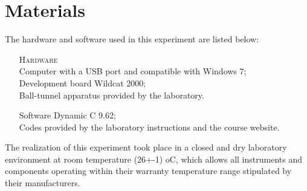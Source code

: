 \section{Materials}

The hardware and software used in this experiment are listed below:

\begin{enumerate}
\item[\textsc{Hardware}]\\
Computer with a USB port and compatible with Windows 7;
\\ Development board Wildcat 2000;
\\ Ball-tunnel apparatus provided by the laboratory.
\\
\item[Software]
Dynamic C 9.62;
\\ Codes provided by the laboratory instructions and the course website.
\\
\end{enumerate}

The realization of this experiment took place in a closed and dry laboratory environment at room temperature (26+-1)  oC, which allows all instruments and components operating within their warranty temperature range stipulated by their manufacturers.
